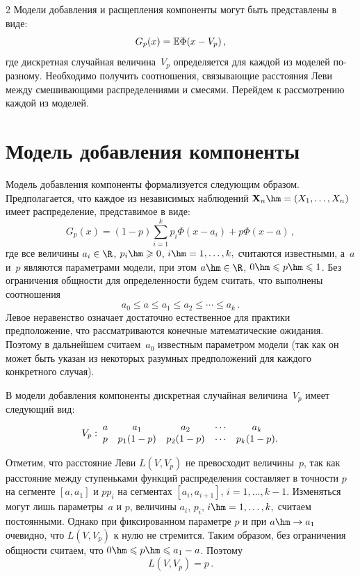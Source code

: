 \begin{multicols}{2}
Модели добавления и расщепления компоненты могут быть
представлены в виде:
$$
G_p(x)=\mathbb E\Phi(x-V_p)\,,
$$
где дискретная случайная величина~$V_p$ определяется для каждой из
моделей по-раз\-но\-му. Необходимо получить соотношения, связывающие
расстояния Леви между смешивающими распределениями и смесями.
Перейдем к рассмотрению каждой из моделей.

\section{Модель добавления компоненты}

Модель добавления компоненты формализуется следующим образом.
Предполагается, что каждое из независимых наблюдений
$\mathbf{X}_n\hm=(X_1,\ldots,X_n)$ имеет распределение,
представимое в виде:
\begin{equation}
\label{Stab_G_p1}
G_p(x)=(1-p)\sum\limits_{i=1}^k
p_i\Phi(x-a_i)+p\Phi(x-a)\,,
\end{equation}
где все величины $a_i\in\R$, $p_i\hm\geqslant 0$, $i\hm=1,\ldots,k,$ считаются
известными, а~$a$ и~$p$ являются параметрами модели, при этом
$a\hm\in\R$, $0\hm\leqslant p\hm\leqslant 1$. Без ограничения общности для
определенности будем считать, что выполнены соотношения
\begin{equation}
\label{Stab_a1}
a_0\leqslant a\leqslant a_1\leqslant a_2\leqslant\cdots\leqslant a_k\,.
\end{equation}
%
Левое неравенство означает достаточно естест\-вен\-ное для практики
предположение, что рас\-смат\-ри\-ва\-ют\-ся конечные математические
ожидания. Поэтому в дальнейшем считаем~$a_0$ известным
параметром модели (так как он может быть указан из некоторых разумных
предположений для каждого конкретного случая).

В модели добавления компоненты дискретная случайная величина~$V_p$
имеет следующий вид:
\begin{equation}
\label{Stab_V_p1} 
V_p:\!\!
\begin{tabular}{ccccc}
$a$\!&$a_1$\!&$a_2$\!&$\cdots$\!\!&$a_k$\\
$p$\!&$p_1(1-p)$\!&$p_2(1-p)$\!&$\cdots$\!\!&$p_k(1-p)$.
\end{tabular}\!\!\!
\end{equation}

Отметим, что расстояние Леви $L(V,V_p)$ не превосходит величины~$p$,
так как расстояние между ступеньками функций распределения
составляет в точности $p$ на сегменте $[a,a_1]$ и $p p_i$ на сегментах
$[a_i,a_{i+1}]$, $i=1,\ldots,k-1$. Изменяться могут лишь параметры~$a$ и
$p$, величины $a_i$, $p_i$, $i\hm=1,\ldots,k,$ считаем постоянными. Однако
при фиксированном параметре $p$ и при $a\hm\to a_1$
очевидно, что $L(V,V_p)$ к нулю не стремится. Таким образом,
без ограничения общности считаем, что $0\hm\leqslant p\hm\leqslant a_1- a$. Поэтому
\begin{equation}
\label{Stab_Cond1} 
L(V,V_p)=p\,.
\end{equation}


\end{multicols}
